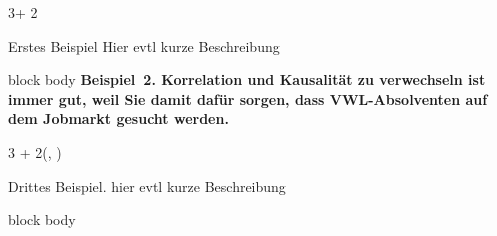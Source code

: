 \documentclass{beamer}
\newlength{\blockThree}
\begin{document}
\begin{frame}[t]
\begin{textblock*}{3\colwidth + 2\colsep}
\begin{alertblock}{%
	\begin{minipage}[b]{60pt}
		\RaggedRight
		\noindent\hspace{-10pt}
	\end{minipage}%
	\begin{minipage}[b]{3\colwidth+2\colsep-125pt}\strut%
		Erstes Beispiel \;
		{\mdseries Hier evtl kurze Beschreibung}
	\end{minipage}%
}
	\vspace{-0.25cm}
	\begin{minipage}{\textwidth}
		\begin{beamercolorbox}[
			ht = 19.75cm, 
			wd = \linewidth, 
			left
		]{block body}
			\centering\textbf{\boldmath Beispiel~2.\; Korrelation und Kausalität zu verwechseln ist immer gut, weil Sie damit dafür sorgen, dass VWL-Absolventen auf dem Jobmarkt gesucht werden.}\par
		\end{beamercolorbox}
	\end{minipage}%
	\vspace{0.5cm}
\end{alertblock}


\end{textblock*}



\begin{textblock*}{3 \colwidth + 2\colsep}(\leftmargin, \blockThree)

\begin{alertblock}{%
	\begin{minipage}[b]{60pt}
		\RaggedRight
		\noindent\hspace{-10pt}
	\end{minipage}%
	\begin{minipage}[b]{2\colwidth+\colsep-125pt}\strut%
		Drittes Beispiel.\; {\mdseries hier evtl kurze Beschreibung}
	\end{minipage}%
}
	\begin{beamercolorbox}[
		ht = 19.75cm, 
		wd = 0.9\linewidth, 
		center
		]{block body}
		\par
	\end{beamercolorbox}
\end{alertblock}


\end{textblock*}
\end{frame}
\end{document}
